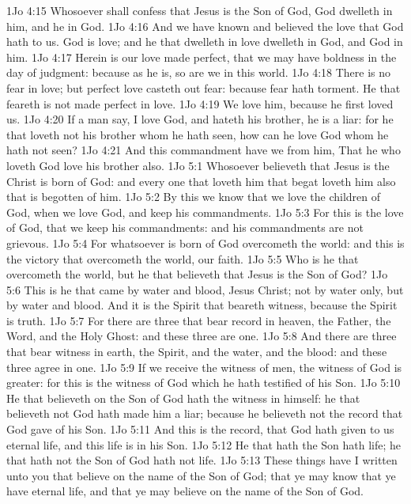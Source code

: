 \vs 1Jo 4:15 Whosoever shall confess that Jesus is the Son of God, God dwelleth in him, and he in God.
\vs 1Jo 4:16 And we have known and believed the love that God hath to us. God is love; and he that dwelleth in love dwelleth in God, and God in him.
\vs 1Jo 4:17 Herein is our love made perfect, that we may have boldness in the day of judgment: because as he is, so are we in this world.
\vs 1Jo 4:18 There is no fear in love; but perfect love casteth out fear: because fear hath torment. He that feareth is not made perfect in love.
\vs 1Jo 4:19 We love him, because he first loved us.
\vs 1Jo 4:20 If a man say, I love God, and hateth his brother, he is a liar: for he that loveth not his brother whom he hath seen, how can he love God whom he hath not seen?
\vs 1Jo 4:21 And this commandment have we from him, That he who loveth God love his brother also.
\vs 1Jo 5:1 Whosoever believeth that Jesus is the Christ is born of God: and every one that loveth him that begat loveth him also that is begotten of him.
\vs 1Jo 5:2 By this we know that we love the children of God, when we love God, and keep his commandments.
\vs 1Jo 5:3 For this is the love of God, that we keep his commandments: and his commandments are not grievous.
\vs 1Jo 5:4 For whatsoever is born of God overcometh the world: and this is the victory that overcometh the world,  our faith.
\vs 1Jo 5:5 Who is he that overcometh the world, but he that believeth that Jesus is the Son of God?
\vs 1Jo 5:6 This is he that came by water and blood,  Jesus Christ; not by water only, but by water and blood. And it is the Spirit that beareth witness, because the Spirit is truth.
\vs 1Jo 5:7 For there are three that bear record in heaven, the Father, the Word, and the Holy Ghost: and these three are one.
\vs 1Jo 5:8 And there are three that bear witness in earth, the Spirit, and the water, and the blood: and these three agree in one.
\vs 1Jo 5:9 If we receive the witness of men, the witness of God is greater: for this is the witness of God which he hath testified of his Son.
\vs 1Jo 5:10 He that believeth on the Son of God hath the witness in himself: he that believeth not God hath made him a liar; because he believeth not the record that God gave of his Son.
\vs 1Jo 5:11 And this is the record, that God hath given to us eternal life, and this life is in his Son.
\vs 1Jo 5:12 He that hath the Son hath life;  he that hath not the Son of God hath not life.
\vs 1Jo 5:13 These things have I written unto you that believe on the name of the Son of God; that ye may know that ye have eternal life, and that ye may believe on the name of the Son of God.
